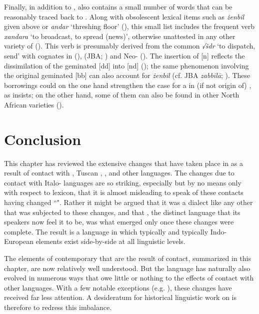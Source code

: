 \documentclass[output=paper]{langsci/langscibook}
\begin{document}
Finally, in addition to ,  also contains a small number of words that can be reasonably traced back to . Along with obsolescent lexical items such as \textit{żenbil} given above or \textit{andar} `threshing floor' (\citealt[116--117]{Behnstedt2005}), this small list includes the frequent verb \textit{xandara} `to broadcast, to spread (news)', otherwise unattested in any other variety of  (\citealt[46]{Borg1996}). This verb is presumably derived from the common   \textit{√šdr} `to dispatch, send' with cognates in  (\citealt[450]{manddic1963}),   (JBA; \citealt[1112-1113]{sokoloff2002}) and  Neo- (\citealt[1179]{Khan2008}). The insertion of [n] reflects the dissimilation of the geminated [dd] into [nd] (\citealt[175--176]{Lipinski1997}); the same phenomenon involving the original geminated [bb] can also account for \textit{żenbil} (cf. JBA \textit{zabbīlā}; \citealt[397]{sokoloff2002}). These borrowings could on the one hand strengthen the case for a   in (if not origin of) , as \cite{Borg1996} insists; on the other hand, some of them can also be found in other North African varieties (\citealt{Behnstedt2005}).

\section{Conclusion}
This chapter has reviewed the extensive changes that have taken place in  as a result of contact with , Tuscan , , and other languages. The changes due to contact with Italo- languages are so striking, especially but by no means only with respect to lexicon, that it is almost misleading to speak of these contacts having changed ``". Rather it might be argued that it was a   dialect like any other that was subjected to these changes, and that , the distinct language that its speakers now feel it to be, was what emerged only once these changes were complete. The result is a language in which typically  and typically Indo-European elements exist side-by-side at all linguistic levels.

The elements of contemporary   that are the result of contact, summarized in this chapter, are now relatively well understood. But the language has naturally also evolved in numerous ways that owe little or nothing to the effects of contact with other languages. With a few notable exceptions (e.g. \citealt{Borg1978,Vanhove1993}), these changes have received far less attention. A desideratum for  historical linguistic work on  is therefore to redress this imbalance.
\end{document}

